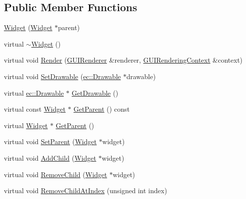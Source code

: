 \subsection*{Public Member Functions}
\begin{DoxyCompactItemize}
\item 
\mbox{\hyperlink{classngl__gui_1_1_widget_a6c94eedacd5b5be0fd989d31f07e75fe}{Widget}} (\mbox{\hyperlink{classngl__gui_1_1_widget}{Widget}} $\ast$parent)
\item 
virtual \mbox{\hyperlink{classngl__gui_1_1_widget_a014c3b016418bd51cd5770ae0e52ae39}{$\sim$\+Widget}} ()
\item 
virtual void \mbox{\hyperlink{classngl__gui_1_1_widget_ac62483b01680572a40125f9208a86392}{Render}} (\mbox{\hyperlink{classngl__gui_1_1_g_u_i_renderer}{G\+U\+I\+Renderer}} \&renderer, \mbox{\hyperlink{classngl__gui_1_1_g_u_i_rendering_context}{G\+U\+I\+Rendering\+Context}} \&context)
\item 
virtual void \mbox{\hyperlink{classngl__gui_1_1_widget_a9c58db403326c6317b61bc2f32262a3c}{Set\+Drawable}} (\mbox{\hyperlink{classec_1_1_drawable}{ec\+::\+Drawable}} $\ast$drawable)
\item 
virtual \mbox{\hyperlink{classec_1_1_drawable}{ec\+::\+Drawable}} $\ast$ \mbox{\hyperlink{classngl__gui_1_1_widget_ad0ff31f602ec55a5f94bc37a48fe312f}{Get\+Drawable}} ()
\item 
virtual const \mbox{\hyperlink{classngl__gui_1_1_widget}{Widget}} $\ast$ \mbox{\hyperlink{classngl__gui_1_1_widget_ae1b1c7de610600c9326a1fad87cf1250}{Get\+Parent}} () const
\item 
virtual \mbox{\hyperlink{classngl__gui_1_1_widget}{Widget}} $\ast$ \mbox{\hyperlink{classngl__gui_1_1_widget_a2c8bf3340abae632270d071affda1bf7}{Get\+Parent}} ()
\item 
virtual void \mbox{\hyperlink{classngl__gui_1_1_widget_a3cdf55b21704618f4d6f915abdb65e8f}{Set\+Parent}} (\mbox{\hyperlink{classngl__gui_1_1_widget}{Widget}} $\ast$widget)
\item 
virtual void \mbox{\hyperlink{classngl__gui_1_1_widget_a37128e55931fa4fe2f99556d4a45607a}{Add\+Child}} (\mbox{\hyperlink{classngl__gui_1_1_widget}{Widget}} $\ast$widget)
\item 
virtual void \mbox{\hyperlink{classngl__gui_1_1_widget_ad41034ddf29536888ea7e1fdbc37df4e}{Remove\+Child}} (\mbox{\hyperlink{classngl__gui_1_1_widget}{Widget}} $\ast$widget)
\item 
virtual void \mbox{\hyperlink{classngl__gui_1_1_widget_a8edf589d7a17f12398855f783b8d6c91}{Remove\+Child\+At\+Index}} (unsigned int index)

\end{DoxyCompactItemize}
